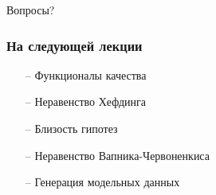 \documentclass[10pt]{beamer}
\begin{document}
\begin{frame}[standout]
  Вопросы?
\end{frame}

\appendix

\begin{frame}\frametitle{На следующей лекции}
	\begin{itemize}
    	\item[--] Функционалы качества
    	\item[--] Неравенство Хефдинга
    	\item[--] Близость гипотез
    	\item[--] Неравенство Вапника-Червоненкиса
    	\item[--] Генерация модельных данных    	    	
	\end{itemize}
\end{frame}
\end{document}
